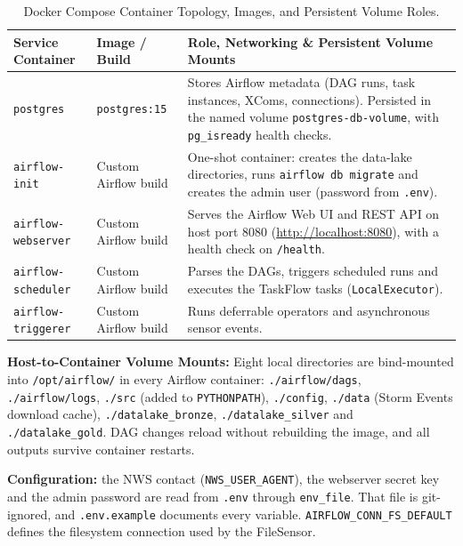\documentclass[stu, 12pt, letterpaper, donotrepeattitle, floatsintext, natbib]{apa7}
\begin{document}
\begin{table}[H]
\centering
\footnotesize
\caption{Docker Compose Container Topology, Images, and Persistent Volume Roles.}
\label{tab:docker_stack}
\begin{tabularx}{\textwidth}{>{\raggedright\arraybackslash}p{2.9cm} >{\raggedright\arraybackslash}p{3.2cm} >{\raggedright\arraybackslash}X}
\toprule
\textbf{Service Container} & \textbf{Image / Build} & \textbf{Role, Networking \& Persistent Volume Mounts} \\
\midrule
\texttt{postgres} & \texttt{postgres:15} & Stores Airflow metadata (DAG runs, task instances, XComs, connections). Persisted in the named volume \texttt{postgres-db-volume}, with \texttt{pg\_isready} health checks. \\
\addlinespace
\texttt{airflow-init} & Custom Airflow build & One-shot container: creates the data-lake directories, runs \texttt{airflow db migrate} and creates the admin user (password from \texttt{.env}). \\
\addlinespace
\texttt{airflow-webserver} & Custom Airflow build & Serves the Airflow Web UI and REST API on host port 8080 (\url{http://localhost:8080}), with a health check on \texttt{/health}. \\
\addlinespace
\texttt{airflow-scheduler} & Custom Airflow build & Parses the DAGs, triggers scheduled runs and executes the TaskFlow tasks (\texttt{LocalExecutor}). \\
\addlinespace
\texttt{airflow-triggerer} & Custom Airflow build & Runs deferrable operators and asynchronous sensor events. \\
\bottomrule
\end{tabularx}
\end{table}

\noindent \textbf{Host-to-Container Volume Mounts:} Eight local directories are bind-mounted into \texttt{/opt/airflow/} in every Airflow container: \texttt{./airflow/dags}, \texttt{./airflow/logs}, \texttt{./src} (added to \texttt{PYTHONPATH}), \texttt{./config}, \texttt{./data} (Storm Events download cache), \texttt{./datalake\_bronze}, \texttt{./datalake\_silver} and \texttt{./datalake\_gold}. DAG changes reload without rebuilding the image, and all outputs survive container restarts.

\noindent \textbf{Configuration:} the NWS contact (\texttt{NWS\_USER\_AGENT}), the webserver secret key and the admin password are read from \texttt{.env} through \texttt{env\_file}. That file is git-ignored, and \texttt{.env.example} documents every variable. \texttt{AIRFLOW\_CONN\_FS\_DEFAULT} defines the filesystem connection used by the FileSensor.
\end{document}
